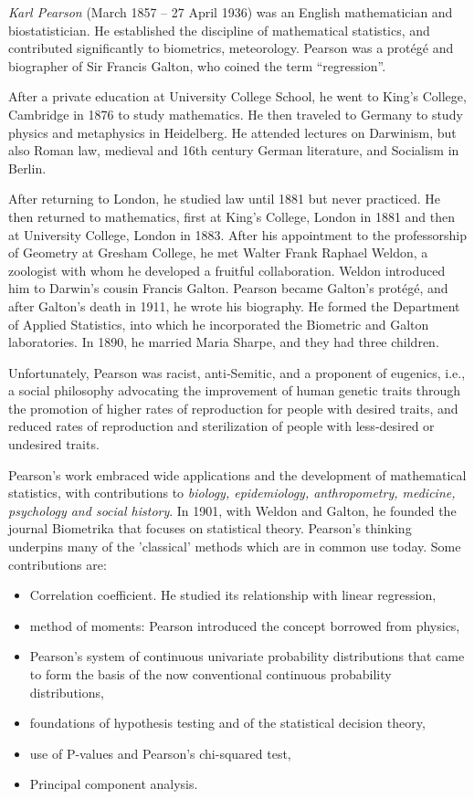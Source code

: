 	\emph{Karl Pearson} (March 1857 – 27 April 1936) was an English mathematician and biostatistician. He established the discipline of mathematical statistics, and contributed significantly to biometrics, meteorology. Pearson was a protégé and biographer of Sir Francis Galton, who coined the term \enquote{regression}.
	
	After a private education at University College School, he went to King's College, Cambridge in 1876 to study mathematics. He then traveled to Germany to study physics and metaphysics in Heidelberg. He attended lectures on Darwinism, but also Roman law, medieval and 16th century German literature, and Socialism in Berlin.
	
	After returning to London, he studied law until 1881 but never practiced. He then returned to mathematics, first at King's College, London in 1881 and then at University College, London in 1883. After his appointment to the professorship of Geometry at Gresham College, he met Walter Frank Raphael Weldon, a zoologist with whom he developed a fruitful collaboration. Weldon introduced him to Darwin's cousin Francis Galton. Pearson became Galton's protégé, and after Galton's death in 1911, he wrote his biography. He formed the Department of Applied Statistics, into which he incorporated the Biometric and Galton laboratories. In 1890, he married Maria Sharpe, and they had three children. 
	
	Unfortunately, Pearson was racist, anti‐Semitic, and a proponent of eugenics, i.e., a social philosophy advocating the improvement of human genetic traits through the promotion of higher rates of reproduction for people with desired traits, and reduced rates of reproduction and sterilization of people with less‐desired or undesired traits. 

	Pearson's work embraced wide applications and the development of mathematical statistics, with contributions to \emph{biology, epidemiology, anthropometry, medicine, psychology and social history}. In 1901, with Weldon and Galton, he founded the journal Biometrika that focuses on statistical theory. Pearson's thinking underpins many of the 'classical' methods which are in common use today. Some contributions are:
	\begin{itemize}
		\setlength{\itemsep}{0pt}
		\setlength{\parskip}{0pt} 		
		\item Correlation coefficient. He studied its relationship with  linear regression,
		\item method of moments: Pearson introduced the concept borrowed from physics,
		\item Pearson's system of continuous univariate probability distributions that came to form the basis of the now conventional continuous probability distributions,
		\item foundations of hypothesis testing and of the statistical decision theory,
		\item use of P-values and Pearson's chi-squared test,
		\item Principal component analysis. 
	\end{itemize}
